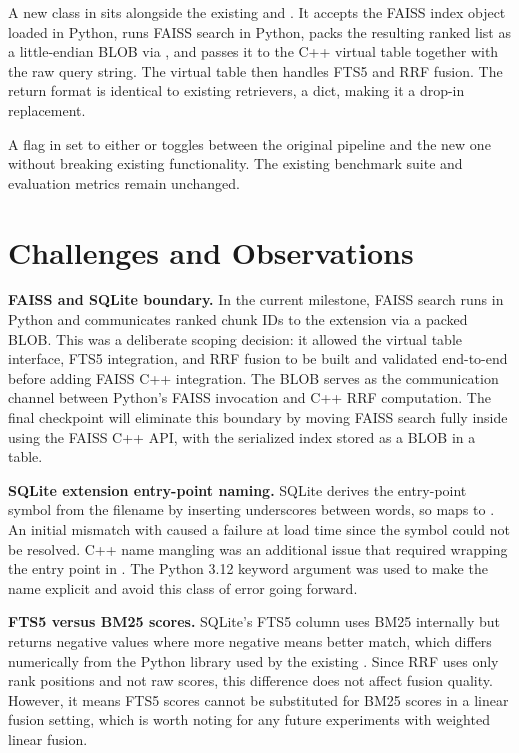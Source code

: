 \documentclass[sigconf,11pt]{acmart}
\begin{document}
A new  class in  sits
alongside the existing  and . It
accepts the FAISS index object loaded in Python, runs FAISS search in Python,
packs the resulting ranked  list as a little-endian 
BLOB via , and passes it to the C++ virtual table together
with the raw query string. The virtual table then handles FTS5 and RRF fusion.
The return format is identical to existing retrievers, a
 dict, making it a drop-in replacement.

A  flag in  set to either
 or  toggles between the original pipeline and the
new one without breaking existing functionality. The existing benchmark suite
and evaluation metrics remain unchanged.

\section{Challenges and Observations}

\textbf{FAISS and SQLite boundary.} In the current milestone, FAISS search runs
in Python and communicates ranked chunk IDs to the extension via a packed BLOB.
This was a deliberate scoping decision: it allowed the virtual table interface,
FTS5 integration, and RRF fusion to be built and validated end-to-end before
adding FAISS C++ integration. The BLOB serves as the communication channel
between Python's FAISS invocation and C++ RRF computation. The final checkpoint
will eliminate this boundary by moving FAISS search fully inside 
using the FAISS C++ API, with the serialized index stored as a BLOB in a
 table.

\textbf{SQLite extension entry-point naming.} SQLite derives the entry-point
symbol from the  filename by inserting underscores between words, so
 maps to . An initial
mismatch with  caused a  failure at
load time since the symbol could not be resolved. C++ name mangling was an
additional issue that required wrapping the entry point in
. The Python 3.12  
keyword argument was used to make the name explicit and avoid this class of
error going forward.

\textbf{FTS5 versus BM25 scores.} SQLite's FTS5  column uses BM25
internally but returns negative values where more negative means better match,
which differs numerically from the  Python library used by the
existing . Since RRF uses only rank positions and not raw
scores, this difference does not affect fusion quality. However, it means FTS5
scores cannot be substituted for BM25 scores in a linear fusion setting, which
is worth noting for any future experiments with weighted linear fusion.
\end{document}
